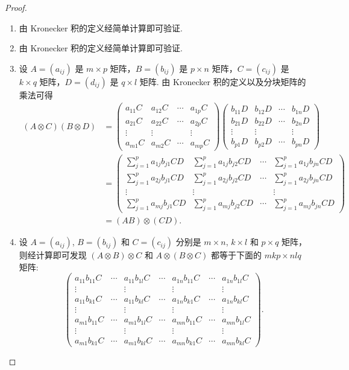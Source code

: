 \documentclass[../../main.tex]{subfiles}%
\begin{document}
\begin{proof}
\begin{enumerate}[(1)]
\item 由 Kronecker 积的定义经简单计算即可验证.

\item 由 Kronecker 积的定义经简单计算即可验证.

\item 设 $A=(a_{ij})$ 是 $m\times p$ 矩阵，$B=(b_{ij})$ 是 $p\times n$ 矩阵，$C=(c_{ij})$ 是 $k\times q$ 矩阵，$D=(d_{ij})$ 是 $q\times l$ 矩阵. 由 Kronecker 积的定义以及分块矩阵的乘法可得
\begin{align*}
(A\otimes C)(B\otimes D)&=
\begin{pmatrix}
a_{11}C & a_{12}C & \cdots & a_{1p}C \\
a_{21}C & a_{22}C & \cdots & a_{2p}C \\
\vdots & \vdots & & \vdots \\
a_{m1}C & a_{m2}C & \cdots & a_{mp}C
\end{pmatrix}
\begin{pmatrix}
b_{11}D & b_{12}D & \cdots & b_{1n}D \\
b_{21}D & b_{22}D & \cdots & b_{2n}D \\
\vdots & \vdots & & \vdots \\
b_{p1}D & b_{p2}D & \cdots & b_{pn}D
\end{pmatrix}\\
&=
\begin{pmatrix}
\sum_{j = 1}^{p}a_{1j}b_{j1}CD & \sum_{j = 1}^{p}a_{1j}b_{j2}CD & \cdots & \sum_{j = 1}^{p}a_{1j}b_{jn}CD \\
\sum_{j = 1}^{p}a_{2j}b_{j1}CD & \sum_{j = 1}^{p}a_{2j}b_{j2}CD & \cdots & \sum_{j = 1}^{p}a_{2j}b_{jn}CD \\
\vdots & \vdots & & \vdots \\
\sum_{j = 1}^{p}a_{mj}b_{j1}CD & \sum_{j = 1}^{p}a_{mj}b_{j2}CD & \cdots & \sum_{j = 1}^{p}a_{mj}b_{jn}CD
\end{pmatrix}\\
&=(AB)\otimes (CD).
\end{align*}

\item 设 $A=(a_{ij})$, $B=(b_{ij})$ 和 $C=(c_{ij})$ 分别是 $m\times n$, $k\times l$ 和 $p\times q$ 矩阵，则经计算即可发现 $(A\otimes B)\otimes C$ 和 $A\otimes (B\otimes C)$ 都等于下面的 $mkp\times nlq$ 矩阵:
\[
\begin{pmatrix}
a_{11}b_{11}C & \cdots & a_{11}b_{1l}C & \cdots & a_{1n}b_{11}C & \cdots & a_{1n}b_{1l}C \\
\vdots & & \vdots & & \vdots & & \vdots \\
a_{11}b_{k1}C & \cdots & a_{11}b_{kl}C & \cdots & a_{1n}b_{k1}C & \cdots & a_{1n}b_{kl}C \\
\vdots & & \vdots & & \vdots & & \vdots \\
a_{m1}b_{11}C & \cdots & a_{m1}b_{1l}C & \cdots & a_{mn}b_{11}C & \cdots & a_{mn}b_{1l}C \\
\vdots & & \vdots & & \vdots & & \vdots \\
a_{m1}b_{k1}C & \cdots & a_{m1}b_{kl}C & \cdots & a_{mn}b_{k1}C & \cdots & a_{mn}b_{kl}C
\end{pmatrix}.
\]


\end{enumerate}
\end{proof}
\end{document}
